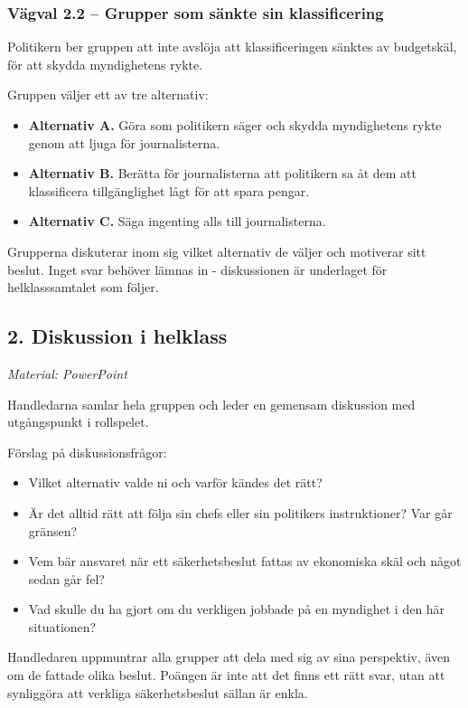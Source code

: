 \documentclass{article}
\begin{document}
\subsubsection{Vägval 2.2 – Grupper som sänkte sin klassificering}

Politikern ber gruppen att inte avslöja att klassificeringen sänktes av budgetskäl, för att skydda myndighetens rykte.

Gruppen väljer ett av tre alternativ:
\begin{itemize}
    \item \textbf{Alternativ A.} Göra som politikern säger och skydda myndighetens rykte genom att ljuga för journalisterna.
    \item \textbf{Alternativ B.} Berätta för journalisterna att politikern sa åt dem att klassificera tillgänglighet lågt för att spara pengar.
    \item \textbf{Alternativ C.} Säga ingenting alls till journalisterna.
\end{itemize}

Grupperna diskuterar inom sig vilket alternativ de väljer och motiverar sitt beslut. Inget svar behöver lämnas in - diskussionen är underlaget för helklasssamtalet som följer.

\subsection{2. Diskussion i helklass}

\textit{Material: PowerPoint}

Handledarna samlar hela gruppen och leder en gemensam diskussion med utgångspunkt i rollspelet.

Förslag på diskussionsfrågor:
\begin{itemize}
    \item Vilket alternativ valde ni och varför kändes det rätt?
    \item Är det alltid rätt att följa sin chefs eller sin politikers instruktioner? Var går gränsen?
    \item Vem bär ansvaret när ett säkerhetsbeslut fattas av ekonomiska skäl och något sedan går fel?
    \item Vad skulle du ha gjort om du verkligen jobbade på en myndighet i den här situationen?
\end{itemize}

Handledaren uppmuntrar alla grupper att dela med sig av sina perspektiv, även om de fattade olika beslut. Poängen är inte att det finns ett rätt svar, utan att synliggöra att verkliga säkerhetsbeslut sällan är enkla.
\end{document}
